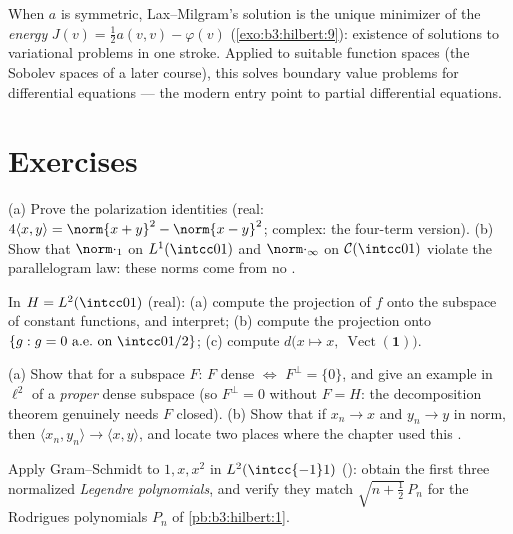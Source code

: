 \begin{remark}\label{rem:b3:hilbert:variational}
When $a$ is symmetric, Lax--Milgram's solution is the unique
minimizer of the \emph{energy} $J(v) = \frac12a(v,v) -
\varphi(v)$ (\cref{exo:b3:hilbert:9}): existence of solutions
to variational problems in one stroke. Applied to suitable
function spaces (the Sobolev spaces of a later course), this
solves boundary value problems for differential equations ---
the modern entry point to partial differential equations.
\end{remark}

\section{Exercises}

\begin{exercise}[$\star$]\label{exo:b3:hilbert:1}
(a) Prove the polarization identities (real: $4\langle x,
y\rangle = \norm{x+y}^2 - \norm{x-y}^2$; complex: the
four-term version).
(b) Show that $\norm\cdot_1$ on $L^1(\intcc01)$ and
$\norm\cdot_\infty$ on $\mathcal C(\intcc01)$ violate the
parallelogram law: these norms come from no .
\end{exercise}

\begin{exercise}[$\star$]\label{exo:b3:hilbert:2}
In $H = L^2(\intcc01)$ (real):
(a) compute the projection of $f$ onto the subspace of
constant functions, and interpret;
(b) compute the projection onto $\{g : g = 0 \text{ a.e.\ on }
\intcc0{1/2}\}$;
(c) compute $d\bigl(x \mapsto x,\ \operatorname{Vect}(\mathbf
1)\bigr)$.
\end{exercise}

\begin{exercise}[$\star\star$]\label{exo:b3:hilbert:3}
(a) Show that for a subspace $F$: $F$ dense $\iff$ $F^\perp =
\{0\}$, and give an example in $\ell^2$ of a \emph{proper}
dense subspace (so $F^\perp = 0$ without $F = H$: the
decomposition theorem genuinely needs $F$ closed).
(b) Show that if $x_n \to x$ and $y_n \to y$ in norm, then
$\langle x_n, y_n\rangle \to \langle x, y\rangle$, and locate
two places where the chapter used this .
\end{exercise}

\begin{exercise}[$\star\star$]\label{exo:b3:hilbert:4}
Apply Gram--Schmidt to $1, x, x^2$ in $L^2(\intcc{-1}1)$
(): obtain the first three normalized
\emph{Legendre polynomials}, and verify they match
$\sqrt{n + \frac12}\,P_n$ for the Rodrigues polynomials $P_n$
of \cref{pb:b3:hilbert:1}.
\end{exercise}

